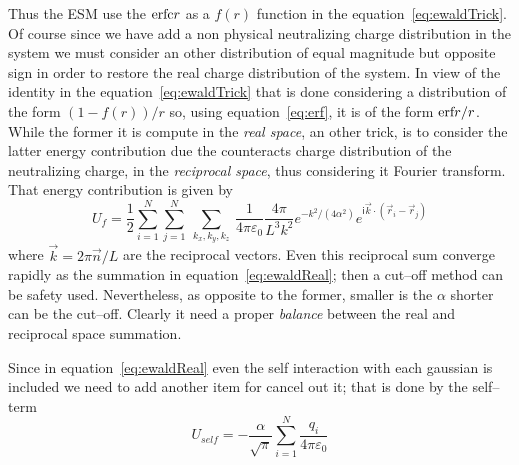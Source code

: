 Thus the \ac{ESM} use the $\text{erfc}r$ as a $f(r)$ function in the equation~\eqref{eq:ewaldTrick}. Of course since we have add a non physical neutralizing charge distribution in the system we must consider an other distribution of equal magnitude but opposite sign in order to restore the real charge distribution of the system. In view of the identity in the equation~\eqref{eq:ewaldTrick} that is done considering a distribution of the form $(1-f(r))/r$ so, using equation~\eqref{eq:erf}, it is of the form $\text{erf}r/r$. While the former it is compute in the \textit{real space}, an other trick, is to consider the latter energy contribution due the counteracts charge distribution of the neutralizing charge, in the \textit{reciprocal space}, thus considering it Fourier transform. That energy contribution is given by
\begin{equation}
	U_f = \frac{1}{2}\sum_{i=1}^N\sum_{j=1}^N\ \sum_{k_x,k_y,k_z}\ \frac{1}{4\pi\varepsilon_0}\frac{4\pi}{L^3k^2}e^{-k^2/(4\alpha^2)}e^{\mathsf{i}{\vec k \cdot (\vec r_i - \vec r_j)}}
	\label{eq:ewaldReciprocal}
\end{equation}
where $\vec k = 2\pi\vec n/L$ are the reciprocal vectors. Even this reciprocal sum converge rapidly as the summation in equation~\eqref{eq:ewaldReal}; then a cut--off method can be safety used. Nevertheless, as opposite to the former, smaller is the $\alpha$ shorter can be the cut--off. Clearly it need a proper \textit{balance} between the real and reciprocal space summation.

Since in equation~\eqref{eq:ewaldReal} even the self interaction with each gaussian is included we need to add another item for cancel out it; that is done by the self--term
\begin{equation}
	U_{self} = -\frac{\alpha}{\sqrt{\pi}}\sum_{i=1}^N\frac{q_i}{4\pi\varepsilon_0}
	\label{eq:EwaldselfTerm}
\end{equation}

